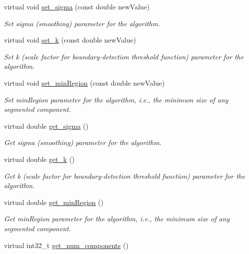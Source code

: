 \begin{DoxyCompactItemize}
\item 
virtual void \hyperlink{classGBSegmModule_a27ffe08d394d321d9f9441423d36ef5e}{set\+\_\+sigma} (const double new\+Value)
\begin{DoxyCompactList}\small\item\em Set sigma (smoothing) parameter for the algorithm. \end{DoxyCompactList}\item 
virtual void \hyperlink{classGBSegmModule_a15129913273e221a46c428f697e40575}{set\+\_\+k} (const double new\+Value)
\begin{DoxyCompactList}\small\item\em Set k (scale factor for boundary-\/detection threshold function) parameter for the algorithm. \end{DoxyCompactList}\item 
virtual void \hyperlink{classGBSegmModule_ae1c722c9c774cbde4f6bfada3f0826ba}{set\+\_\+min\+Region} (const double new\+Value)
\begin{DoxyCompactList}\small\item\em Set min\+Region parameter for the algorithm, i.\+e., the minimum size of any segmented component. \end{DoxyCompactList}\item 
virtual double \hyperlink{classGBSegmModule_ae32ae1b1461e19c3a1b2f429c729ed03}{get\+\_\+sigma} ()
\begin{DoxyCompactList}\small\item\em Get sigma (smoothing) parameter for the algorithm. \end{DoxyCompactList}\item 
virtual double \hyperlink{classGBSegmModule_a44bab99aa7a035e57a185673c040d2f6}{get\+\_\+k} ()
\begin{DoxyCompactList}\small\item\em Get k (scale factor for boundary-\/detection threshold function) parameter for the algorithm. \end{DoxyCompactList}\item 
virtual double \hyperlink{classGBSegmModule_a2378b95e60b406a119947aa86b5bb9c4}{get\+\_\+min\+Region} ()
\begin{DoxyCompactList}\small\item\em Get min\+Region parameter for the algorithm, i.\+e., the minimum size of any segmented component. \end{DoxyCompactList}\item 
virtual int32\+\_\+t \hyperlink{classGBSegmModule_a655ee7c895eed07b07099133b9d8ce68}{get\+\_\+num\+\_\+components} ()

\end{DoxyCompactItemize}
